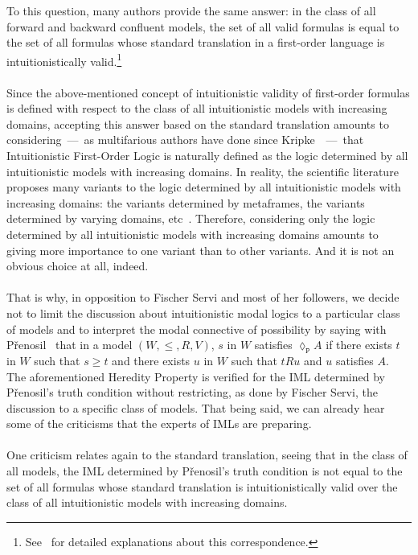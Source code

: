 \documentclass[draft]{article}
\begin{document}
To this question, many authors provide the same answer: in the class of all forward and backward confluent models, the set of all valid formulas is equal to the set of all formulas whose standard translation in a first-order language is intuitionistically valid.\footnote{See~\cite[Chapter~$5$]{Simpson:1994} for detailed explanations about this correspondence.}
%
%
\\
\\
%
%
Since the above-mentioned concept of intuitionistic validity of first-order formulas is defined with respect to the class of all intuitionistic models with increasing domains, accepting this answer based on the standard translation amounts to considering~---~as multifarious authors have done since Kripke~\cite{Kripke:1965}~---~that Intuitionistic First-Order Logic is naturally defined as the logic determined by all intuitionistic models with increasing domains.
In reality, the scientific literature proposes many variants to the logic determined by all intuitionistic models with increasing domains: the variants determined by metaframes, the variants determined by varying domains, etc~\cite[Chapters~$5$ and~$6$]{Gabbay:et:al:2009}.
Therefore, considering only the logic determined by all intuitionistic models with increasing domains amounts to giving more importance to one variant than to other variants.
And it is not an obvious choice at all, indeed.
%
%
\\
\\
%
%
That is why, in opposition to Fischer Servi and most of her followers, we decide not to limit the discussion about intuitionistic modal logics to a particular class of models and to interpret the modal connective of possibility by saying with P\v{r}enosil~\cite{Prenosil:2014} that in a model $(W,{\leq},{R},V)$, $s$ in $W$ satisfies ${\lozenge_{\mathtt{P}}}A$ if there exists $t$ in $W$ such that $s{\geq}t$ and there exists $u$ in $W$ such that $t{R}u$ and $u$ satisfies $A$.
The aforementioned Heredity Property is verified for the IML determined by P\v{r}enosil's truth condition without restricting, as done by Fischer Servi, the discussion to a specific class of models.
That being said, we can already hear some of the criticisms that the experts of IMLs are preparing.
%
%
\\
\\
%
%
One criticism relates again to the standard translation, seeing that in the class of all models, the IML determined by P\v{r}enosil's truth condition is not equal to the set of all formulas whose standard translation is intuitionistically valid over the class of all intuitionistic models with increasing domains.
\end{document}
